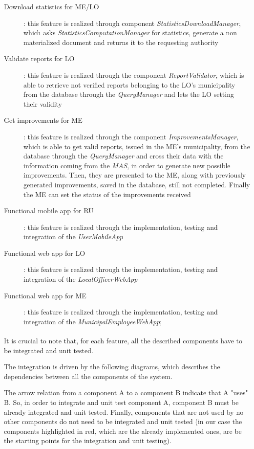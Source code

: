 \begin{description}
				\item [Download statistics for ME/LO]: this feature is realized through component \textit{StatisticsDownloadManager}, which asks \textit{StatisticsComputationManager} for statistics, generate a non materialized document and returns it to the requesting authority
				\item [Validate reports for LO]: this feature is realized through the component \textit{ReportValidator}, which is able to retrieve not verified reports belonging to the LO's municipality from the database through the \textit{QueryManager} and lets the LO setting their validity
				\item [Get improvements for ME]: this feature is realized through the component \textit{ImprovementsManager}, which is able to get valid reports, issued in the ME's municipality, from the database through the \textit{QueryManager} and cross their data with the information coming from the \textit{MAS}, in order to generate new possible improvements. Then, they are presented to the ME, along with previously generated improvements, saved in the database, still not completed. Finally the ME can set the status of the improvements received
				\item [Functional mobile app for RU]: this feature is realized through the implementation, testing and integration of the \textit{UserMobileApp}
				\item [Functional web app for LO]: this feature is realized through the implementation, testing and integration of the \textit{LocalOfficerWebApp}
				\item [Functional web app for ME]: this feature is realized through the implementation, testing and integration of the \textit{MunicipalEmployeeWebApp};
			\end{description}
		\paragraph{}
			It is crucial to note that, for each feature, all the described components have to be integrated and unit tested. 
			
			The integration is driven by the following diagrams, which describes the dependencies between all the components of the system. 
			
			The arrow relation from a component A to a component B indicate that A "uses" B. So, in order to integrate and unit test component A, component B must be already integrated and unit tested. Finally, components that are not used by no other components do not need to be integrated and unit tested (in our case the components highlighted in red, which are the already implemented ones, are be the starting points for the integration and unit testing).
			
